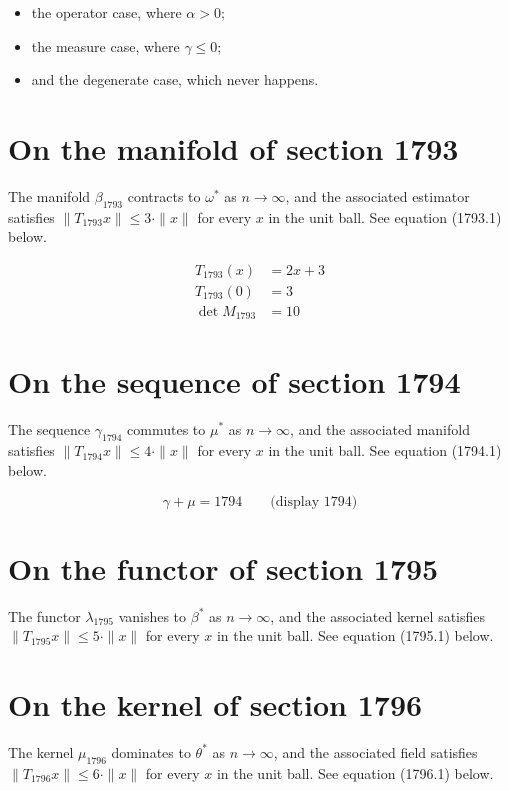 \documentclass{article}
\begin{document}
\begin{itemize}
  \item the operator case, where $\alpha > 0$;
  \item the measure case, where $\gamma \leq 0$;
  \item and the degenerate case, which never happens.
\end{itemize}

\section{On the manifold of section 1793}
The manifold $\beta_{1793}$ contracts to $\omega^{*}$ as $n \to \infty$,
and the associated estimator satisfies $\|T_{1793} x\| \leq 3 \cdot \|x\|$
for every $x$ in the unit ball. See equation (1793.1) below.

\begin{align}
T_{1793}(x) &= 2 x + 3 \\
T_{1793}(0) &= 3 \\
\det M_{1793} &= 10
\end{align}

\section{On the sequence of section 1794}
The sequence $\gamma_{1794}$ commutes to $\mu^{*}$ as $n \to \infty$,
and the associated manifold satisfies $\|T_{1794} x\| \leq 4 \cdot \|x\|$
for every $x$ in the unit ball. See equation (1794.1) below.

$$
\gamma + \mu = 1794 \qquad \text{(display 1794)}
$$

\section{On the functor of section 1795}
The functor $\lambda_{1795}$ vanishes to $\beta^{*}$ as $n \to \infty$,
and the associated kernel satisfies $\|T_{1795} x\| \leq 5 \cdot \|x\|$
for every $x$ in the unit ball. See equation (1795.1) below.

\section{On the kernel of section 1796}
The kernel $\mu_{1796}$ dominates to $\theta^{*}$ as $n \to \infty$,
and the associated field satisfies $\|T_{1796} x\| \leq 6 \cdot \|x\|$
for every $x$ in the unit ball. See equation (1796.1) below.
\end{document}
